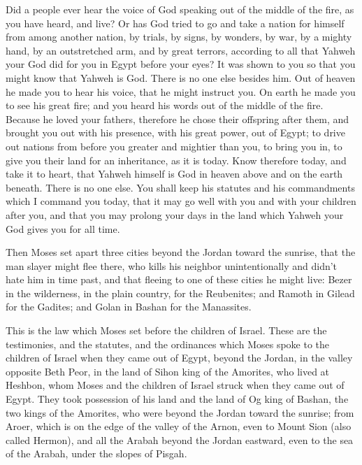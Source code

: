 {Did a people ever hear the voice of God speaking out of the middle of the fire, as you have heard, and live?
Or has God tried to go and take a nation for himself from among another nation, by trials, by signs, by wonders, by war, by a mighty hand, by an outstretched arm, and by great terrors, according to all that Yahweh your God did for you in Egypt before your eyes?
It was shown to you so that you might know that Yahweh is God. There is no one else besides him.
Out of heaven he made you to hear his voice, that he might instruct you. On earth he made you to see his great fire; and you heard his words out of the middle of the fire.
Because he loved your fathers, therefore he chose their offspring after them, and brought you out with his presence, with his great power, out of Egypt;
to drive out nations from before you greater and mightier than you, to bring you in, to give you their land for an inheritance, as it is today.
Know therefore today, and take it to heart, that Yahweh himself is God in heaven above and on the earth beneath. There is no one else.
You shall keep his statutes and his commandments which I command you today, that it may go well with you and with your children after you, and that you may prolong your days in the land which Yahweh your God gives you for all time.
\par }{\PP {}Then Moses set apart three cities beyond the Jordan toward the sunrise,
that the man slayer might flee there, who kills his neighbor unintentionally and didn’t hate him in time past, and that fleeing to one of these cities he might live:
Bezer in the wilderness, in the plain country, for the Reubenites; and Ramoth in Gilead for the Gadites; and Golan in Bashan for the Manassites.
\par }{\PP {}This is the law which Moses set before the children of Israel.
These are the testimonies, and the statutes, and the ordinances which Moses spoke to the children of Israel when they came out of Egypt,
beyond the Jordan, in the valley opposite Beth Peor, in the land of Sihon king of the Amorites, who lived at Heshbon, whom Moses and the children of Israel struck when they came out of Egypt.
They took possession of his land and the land of Og king of Bashan, the two kings of the Amorites, who were beyond the Jordan toward the sunrise;
from Aroer, which is on the edge of the valley of the Arnon, even to Mount Sion (also called Hermon),
and all the Arabah beyond the Jordan eastward, even to the sea of the Arabah, under the slopes of Pisgah.

}
